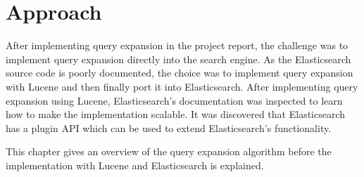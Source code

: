 \chapter{Approach}
\label{ch:approach}
After implementing query expansion in the project report,
the challenge was to implement query expansion directly into the search engine.
As the Elasticsearch source code is poorly documented,
the choice was to implement query expansion with Lucene and then finally port it into Elasticsearch.
After implementing query expansion using Lucene,
Elasticsearch's documentation was inspected to learn how to make the implementation scalable.
It was discovered that Elasticsearch has a plugin API which can be used to extend Elasticsearch's functionality.

This chapter gives an overview of the query expansion algorithm before the implementation with Lucene and Elasticsearch is explained.


